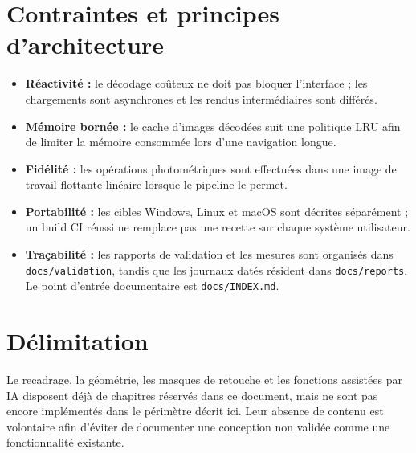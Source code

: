 \section{Contraintes et principes d'architecture}

\begin{itemize}
  \item \textbf{Réactivité :} le décodage coûteux ne doit pas bloquer l'interface ; les chargements sont asynchrones et les rendus intermédiaires sont différés.
  \item \textbf{Mémoire bornée :} le cache d'images décodées suit une politique LRU afin de limiter la mémoire consommée lors d'une navigation longue.
  \item \textbf{Fidélité :} les opérations photométriques sont effectuées dans une image de travail flottante linéaire lorsque le pipeline le permet.
  \item \textbf{Portabilité :} les cibles Windows, Linux et macOS sont décrites séparément ; un build CI réussi ne remplace pas une recette sur chaque système utilisateur.
  \item \textbf{Traçabilité :} les rapports de validation et les mesures sont organisés dans \texttt{docs/validation}, tandis que les journaux datés résident dans \texttt{docs/reports}. Le point d'entrée documentaire est \texttt{docs/INDEX.md}.
\end{itemize}

\section{Délimitation}

Le recadrage, la géométrie, les masques de retouche et les fonctions assistées par IA disposent déjà de chapitres réservés dans ce document, mais ne sont pas encore implémentés dans le périmètre décrit ici. Leur absence de contenu est volontaire afin d'éviter de documenter une conception non validée comme une fonctionnalité existante.
